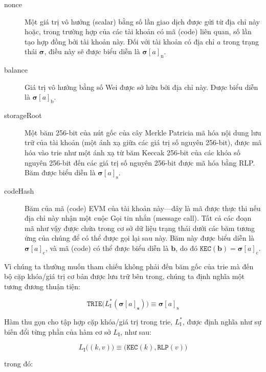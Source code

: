 \documentclass[9pt,oneside]{amsart}
\makeatletter
\newcommand{\linkdest}[1]{\Hy@raisedlink{\hypertarget{#1}{}}}
\makeatother
\begin{document}
\begin{multicols}{2}
\begin{description}
\item[nonce] \linkdest{account_nonce}Một giá trị vô hướng (scalar) bằng số lần giao dịch được gửi từ địa chỉ này hoặc, trong trường hợp của các tài khoản có mã (code) liên quan, số lần tạo hợp đồng bởi tài khoản này. Đối với tài khoản có địa chỉ $a$ trong trạng thái $\boldsymbol{\sigma}$, điều này sẽ được biểu diễn là $\boldsymbol{\sigma}[a]_{\mathrm{n}}$.
\item[balance] Giá trị vô hướng bằng số Wei được sở hữu bởi địa chỉ này. Được biểu diễn là $\boldsymbol{\sigma}[a]_{\mathrm{b}}$.
\item[storageRoot] Một băm 256-bit của nút gốc của cây Merkle Patricia mã hóa nội dung lưu trữ của tài khoản (một ánh xạ giữa các giá trị số nguyên 256-bit), được mã hóa vào trie như một ánh xạ từ băm Keccak 256-bit của các khóa số nguyên 256-bit đến các giá trị số nguyên 256-bit được mã hóa bằng RLP. Băm được biểu diễn là $\boldsymbol{\sigma}[a]_{\mathrm{s}}$.
\item[codeHash] Băm của mã (code) EVM của tài khoản này—đây là mã được thực thi nếu địa chỉ này nhận một cuộc Gọi tin nhắn (message call). Tất cả các đoạn mã như vậy được chứa trong cơ sở dữ liệu trạng thái dưới các băm tương ứng của chúng để có thể được gọi lại sau này. Băm này được biểu diễn là $\boldsymbol{\sigma}[a]_{\mathrm{c}}$, và mã (code) có thể được biểu diễn là $\mathbf{b}$, do đó $\texttt{KEC}(\mathbf{b}) = \boldsymbol{\sigma}[a]_{\mathrm{c}}$.
\end{description}

Vì chúng ta thường muốn tham chiếu không phải đến băm gốc của trie mà đến bộ cặp khóa/giá trị cơ bản được lưu trữ bên trong, chúng ta định nghĩa một tương đương thuận tiện:

\begin{equation}
\texttt{TRIE}\big(L_{\mathrm{I}}^*(\boldsymbol{\sigma}[a]_{\mathbf{s}})\big) \equiv \boldsymbol{\sigma}[a]_{\mathrm{s}}
\end{equation}

Hàm thu gọn cho tập hợp cặp khóa/giá trị trong trie, $L_{\mathrm{I}}^*$, được định nghĩa như sự biến đổi từng phần của hàm cơ sở $L_{\mathrm{I}}$, như sau:

\begin{equation}
L_{\mathrm{I}}\big( (k, v) \big) \equiv \big(\texttt{KEC}(k), \texttt{RLP}(v)\big)
\end{equation}

trong đó:


\end{multicols}
\end{document}
